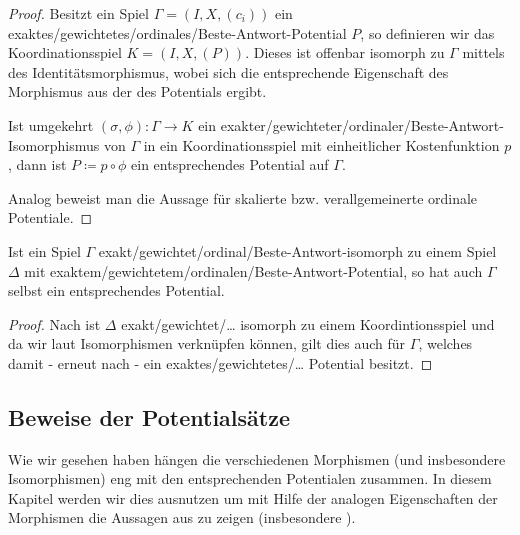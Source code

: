 \begin{proof}
	Besitzt ein Spiel $\Gamma= (I, X, (c_i))$ ein exaktes/gewichtetes/ordinales/Beste-Antwort-Potential $P$, so definieren wir das Koordinationsspiel $K = (I, X, (P))$. Dieses ist offenbar isomorph zu $\Gamma$ mittels des Identitätsmorphismus, wobei sich die entsprechende Eigenschaft des Morphismus aus der des Potentials ergibt.
	
	Ist umgekehrt $(\sigma, \phi): \Gamma \to K$ ein exakter/gewichteter/ordinaler/Beste-Antwort-Isomorphismus von $\Gamma$ in ein Koordinationsspiel mit einheitlicher Kostenfunktion $p$, dann ist $P \coloneqq p \circ \phi$ ein entsprechendes Potential auf $\Gamma$.
	
	Analog beweist man die Aussage für skalierte bzw. verallgemeinerte ordinale Potentiale.
\end{proof}

\begin{kor}\label{kor:PotentialeDurchIsosUebertragen}
	Ist ein Spiel $\Gamma$ exakt/gewichtet/ordinal/Beste-Antwort-isomorph zu einem Spiel $\Delta$ mit exaktem/gewichtetem/ordinalen/Beste-Antwort-Potential, so hat auch $\Gamma$ selbst ein entsprechendes Potential.
\end{kor}

\begin{proof}
	Nach  ist $\Delta$ exakt/gewichtet/\dots{} isomorph zu einem Koordintionsspiel und da wir laut  Isomorphismen verknüpfen können, gilt dies auch für $\Gamma$, welches damit - erneut nach  - ein exaktes/gewichtetes/\dots{} Potential besitzt.
\end{proof}


\subsection{Beweise der Potentialsätze}\label{sec:Morphismen:Potentialsaetze}

Wie wir gesehen haben hängen die verschiedenen Morphismen (und insbesondere Isomorphismen) eng mit den entsprechenden Potentialen zusammen. In diesem Kapitel werden wir dies ausnutzen um mit Hilfe der analogen Eigenschaften der Morphismen die Aussagen aus  zu zeigen (insbesondere ).

